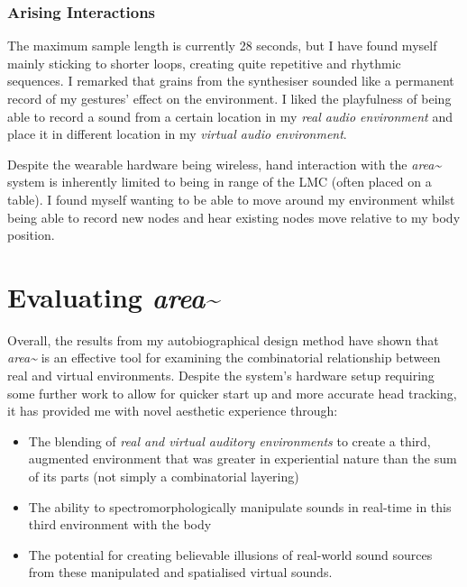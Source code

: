 \subsubsection{Arising Interactions}\label{sec: area-study-results-arisingints}
The maximum sample length is currently 28 seconds, but I have found myself mainly sticking to shorter loops, creating quite repetitive and rhythmic sequences. I remarked that grains from the synthesiser sounded like a permanent record of my gestures' effect on the environment. I liked the playfulness of being able to record a sound from a certain location in my \textit{real audio environment} and place it in different location in my \textit{virtual audio environment}.

Despite the wearable hardware being wireless, hand interaction with the \textit{area\textasciitilde{}} system is inherently limited to being in range of the LMC (often placed on a table). I found myself wanting to be able to move around my environment whilst being able to record new nodes and hear existing nodes move relative to my body position.
\section{Evaluating \textit{area\textasciitilde{}}}\label{sec: area-discussion-aar}
Overall, the results from my autobiographical design method have shown that \textit{area\textasciitilde{}} is an effective tool for examining the combinatorial relationship between real and virtual environments. Despite the system's hardware setup requiring some further work to allow for quicker start up and more accurate head tracking, it has provided me with novel aesthetic experience through:
\begin{itemize}
    \item The blending of \textit{real and virtual auditory environments} to create a third, augmented environment that was greater in experiential nature than the sum of its parts (not simply a combinatorial layering)
    \item The ability to spectromorphologically manipulate sounds in real-time in this third environment with the body
    \item The potential for creating believable illusions of real-world sound sources from these manipulated and spatialised virtual sounds.
\end{itemize}

